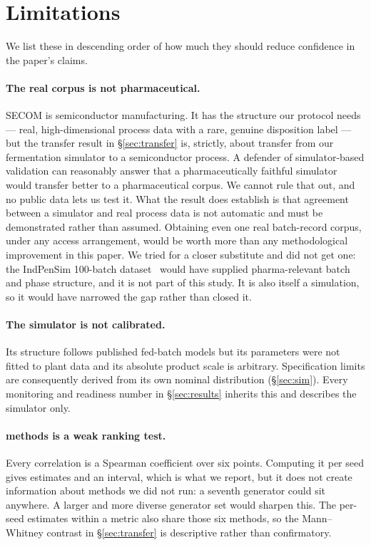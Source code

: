 \documentclass[11pt]{article}
\newcommand{\corpusreal}{SECOM}
\begin{document}
\section{Limitations}
\label{sec:limitations}

We list these in descending order of how much they should reduce confidence in
the paper's claims.

\paragraph{The real corpus is not pharmaceutical.} \corpusreal{} is semiconductor
manufacturing. It has the structure our protocol needs --- real, high-dimensional
process data with a rare, genuine disposition label --- but the transfer result
in \S\ref{sec:transfer} is, strictly, about transfer from our fermentation
simulator to a semiconductor process. A defender of simulator-based validation
can reasonably answer that a pharmaceutically faithful simulator would transfer
better to a pharmaceutical corpus. We cannot rule that out, and no public data
lets us test it. What the result does establish is that agreement between a
simulator and real process data is not automatic and must be demonstrated rather
than assumed. Obtaining even one real batch-record corpus, under any access
arrangement, would be worth more than any methodological improvement in this
paper. We tried for a closer substitute and did not get one: the IndPenSim
100-batch dataset~\citep{goldrick2019indpensim} would have supplied
pharma-relevant batch and phase structure, and it is not part of this study. It
is also itself a simulation, so it would have narrowed the gap rather than
closed it.

\paragraph{The simulator is not calibrated.} Its structure follows published
fed-batch models but its parameters were not fitted to plant data and its
absolute product scale is arbitrary. Specification limits are consequently
derived from its own nominal distribution (\S\ref{sec:sim}). Every monitoring and
readiness number in \S\ref{sec:results} inherits this and describes the simulator
only.

\paragraph{\nMethods{} methods is a weak ranking test.} Every correlation is a
Spearman coefficient over six points. Computing it per seed gives \nSeeds{}
estimates and an interval, which is what we report, but it does not create
information about methods we did not run: a seventh generator could sit anywhere.
A larger and more diverse generator set would sharpen this. The per-seed
estimates within a metric also share those six methods, so the Mann--Whitney
contrast in \S\ref{sec:transfer} is descriptive rather than confirmatory.
\end{document}
